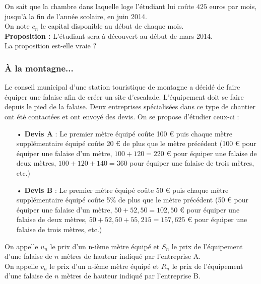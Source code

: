 On sait que la chambre dans laquelle loge l'étudiant lui coûte $425$ euros par mois, jusqu'à la fin de l'année scolaire, en juin 2014. \\

On note $c_n$ le capital disponible au début de chaque mois. \\

\textbf{Proposition :} L'étudiant sera à découvert au début de mars 2014. \\

La proposition est-elle vraie ? \\

\newpage

\subsubsection{À la montagne...}

Le conseil municipal d'une station touristique de montagne a décidé de faire équiper une falaise afin de créer un site d'escalade. L'équipement doit se faire depuis le pied de la falaise. Deux entreprises spécialisées dans ce type de chantier ont été contactées et ont envoyé des devis. On se propose d'étudier ceux-ci : \\

\begin{itemize}
\item[•] \textbf{Devis A} : Le premier mètre équipé coûte 100 € puis chaque mètre supplémentaire équipé coûte 20 € de plus que le mètre précédent (100 € pour équiper une falaise d'un mètre, $100 + 120 = 220$ € pour équiper une falaise de deux mètres, $100 + 120 + 140 = 360$ pour équiper une falaise de trois mètres, etc.) \\
\item[•] \textbf{Devis B} : Le premier mètre équipé coûte 50 € puis chaque mètre supplémentaire équipé coûte 5\% de plus que le mètre précédent (50 € pour équiper une falaise d'un mètre, $50 + 52,50 = 102,50$ € pour équiper une falaise de deux mètres, $50 + 52,50 + 55,215 = 157,625$ € pour équiper une falaise de trois mètres, etc.) \\
\end{itemize}

On appelle $u_n$ le prix d'un n-ième mètre équipé et $S_n$ le prix de l'équipement d'une falaise de $n$ mètres de hauteur indiqué par l'entreprise A. \\
On appelle $v_n$ le prix d'un n-ième mètre équipé et $R_n$ le prix de l'équipement d'une falaise de $n$ mètres de hauteur indiqué par l'entreprise B. \\

